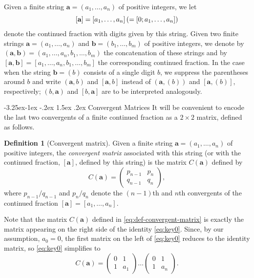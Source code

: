 \documentclass[10pt]{article}
\makeatletter
\renewcommand\subsection{\@startsection{subsection}{2}{\z@}
{-3.25ex\@plus -1ex \@minus -.2ex}
{1.5ex \@plus .2ex}
{\normalfont\normalsize\bfseries\boldmath}}
\theoremstyle{definition}
\newtheorem{definition}[lemma]{Definition}
\numberwithin{equation}{section}
\numberwithin{lemma}{section}
\newcommand{\bfa}{\mathbf{a}}
\newcommand{\bfb}{\mathbf{b}}
\newcommand{\mat}[1]{\begin{pmatrix} 0 & 1\\ 1 & #1\end{pmatrix}}
\makeatother
\begin{document}
Given a finite string $\bfa=(a_1,\dots,a_n)$ of positive integers, we let 
\begin{equation}
\notag
[\bfa]=[a_1,\dots,a_n]
\left(=[0;a_1,\dots,a_n]\right)
\end{equation}
denote the continued fraction with digits given by this string. 
Given two finite strings 
$\bfa=(a_1,\dots,a_n)$ and $\bfb=(b_1,\dots,b_m)$ of positive integers,
we denote by $(\bfa,\bfb)=(a_1,\dots,a_n,b_1,\dots,b_m)$ the
concatenation of these strings and by 
$[\bfa,\bfb]=[a_1,\dots,a_n,b_1,\dots,b_m]$
the corresponding continued fraction.
In the case when the string $\bfb=(b)$ consists of a single digit $b$, we 
suppress the parentheses around $b$ and write $(\bfa,b)$ and $[\bfa,b]$
instead of $(\bfa,(b))$ and $[\bfa,(b)]$, respectively;
$(b,\bfa)$ and $[b,\bfa]$ are to be interpreted analogously.


\subsection{Convergent Matrices}
It will be convenient to encode the last two convergents of a finite
continued fraction as a $2\times 2$ matrix, defined as follows. 

\begin{definition}[Convergent matrix]
\label{def:convergent-matrix}
Given a finite string $\bfa=(a_1,\dots,a_n)$ of positive integers, 
the \emph{convergent matrix} associated with this string (or with the
continued fraction, $[\bfa]$, defined by this string)
is  the matrix $C(\bfa)$ defined by 
\begin{equation}
\label{eq:def-convergent-matrix}
C(\bfa)=
\begin{pmatrix} p_{n-1} & p_n\\ q_{n-1} & q_n\end{pmatrix},
\end{equation}
where $p_{n-1}/q_{n-1}$ and $p_n/q_n$ denote the 
$(n-1)$th and $n$th convergents 
of the continued fraction $[\bfa]=[a_1,\dots,a_n]$.
\end{definition}

Note that the matrix $C(\bfa)$ defined in \eqref{eq:def-convergent-matrix}
is exactly the matrix appearing on the right side of the identity
\eqref{eq:key0}.  Since, by our assumption, $a_0=0$, 
the first matrix on the left of 
\eqref{eq:key0} reduces to the identity matrix, so
\eqref{eq:key0} simplifies to
\begin{equation}
\label{eq:key1}
C(\bfa)=\mat{a_1}\dots \mat{a_n}.
\end{equation}
\end{document}
